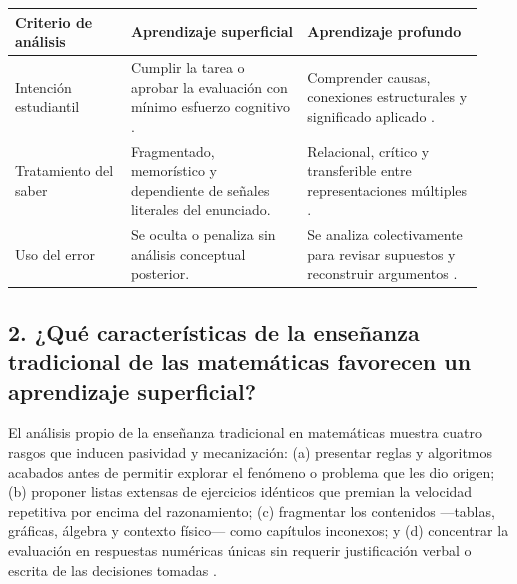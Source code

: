 \documentclass[spanish,letterpaper,oneside]{article}
\begin{document}
\begin{tcolorbox}[colback=iiiepePale,colframe=iiiepeNavy,title=\textbf{Síntesis comparativa · Enfoque superficial frente a aprendizaje profundo},breakable]
{\small\renewcommand{\arraystretch}{1.28}
\begin{tabular}{|p{0.23\linewidth}|p{0.35\linewidth}|p{0.35\linewidth}|}\hline
\rowcolor{iiiepePale} \textbf{Criterio de análisis} & \textbf{Aprendizaje superficial} & \textbf{Aprendizaje profundo} \\\hline
Intención estudiantil & Cumplir la tarea o aprobar la evaluación con mínimo esfuerzo cognitivo \citep{marton1976qualitative}. & Comprender causas, conexiones estructurales y significado aplicado \citep{quiroga2022aprendizaje}. \\\hline
Tratamiento del saber & Fragmentado, memorístico y dependiente de señales literales del enunciado. & Relacional, crítico y transferible entre representaciones múltiples \citep{sawyer2008optimizing}. \\\hline
Uso del error & Se oculta o penaliza sin análisis conceptual posterior. & Se analiza colectivamente para revisar supuestos y reconstruir argumentos \citep{eef2021feedback}. \\\hline
\end{tabular}}
\end{tcolorbox}

\subsection*{2. ¿Qué características de la enseñanza tradicional de las matemáticas favorecen un aprendizaje superficial?}
El análisis propio de la enseñanza tradicional en matemáticas muestra cuatro rasgos que inducen pasividad y mecanización: (a) presentar reglas y algoritmos acabados antes de permitir explorar el fenómeno o problema que les dio origen; (b) proponer listas extensas de ejercicios idénticos que premian la velocidad repetitiva por encima del razonamiento; (c) fragmentar los contenidos —tablas, gráficas, álgebra y contexto físico— como capítulos inconexos; y (d) concentrar la evaluación en respuestas numéricas únicas sin requerir justificación verbal o escrita de las decisiones tomadas \citep{star2015algebra,eef2017mathematics}.
\end{document}
